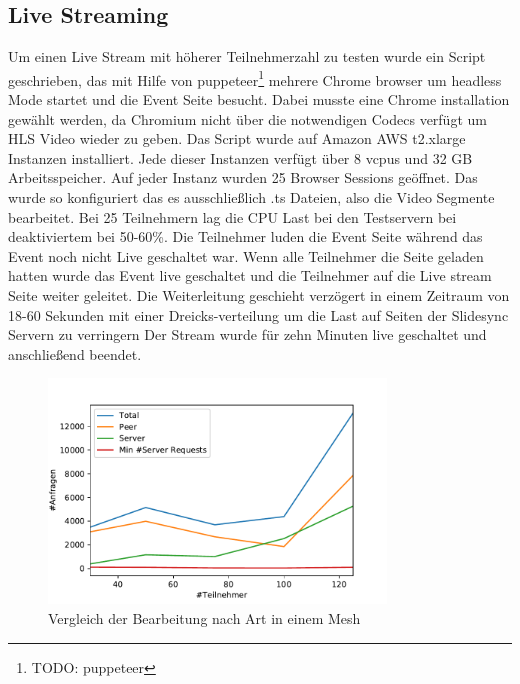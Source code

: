 \subsection{Live Streaming}
Um einen Live Stream mit höherer Teilnehmerzahl zu testen wurde ein Script geschrieben, das mit Hilfe von puppeteer\footnote{TODO: puppeteer} mehrere Chrome browser um headless Mode startet und die Event Seite besucht. Dabei musste eine Chrome installation gewählt werden, da Chromium nicht über die notwendigen Codecs verfügt um HLS Video wieder zu geben. 
Das Script wurde auf Amazon AWS t2.xlarge Instanzen installiert. Jede dieser Instanzen verfügt über 8 vcpus und 32 GB Arbeitsspeicher. Auf jeder Instanz wurden 25 Browser Sessions geöffnet.  Das \cdn wurde so konfiguriert das es ausschließlich .ts Dateien, also die Video Segmente bearbeitet. Bei 25 Teilnehmern lag die CPU Last bei den Testservern bei deaktiviertem \pTp \cdn bei 50-60\%. 
Die Teilnehmer luden die Event Seite während das Event noch nicht Live geschaltet war. Wenn alle Teilnehmer die Seite geladen hatten wurde das Event live geschaltet und die Teilnehmer auf die Live stream Seite weiter geleitet. Die Weiterleitung geschieht verzögert in einem Zeitraum von 18-60 Sekunden mit einer Dreicks-verteilung um die Last auf Seiten der Slidesync Servern zu verringern Der Stream wurde für zehn Minuten live geschaltet und anschließend beendet.

\begin{figure}[!h]
	\centering
	\includegraphics[width=0.8\textwidth]{figures/single_mesh_line}
	\caption[A Figure Short-Title]{Vergleich der Bearbeitung nach Art in einem Mesh}
	\label{fig:single_mesh_line}
\end{figure}

